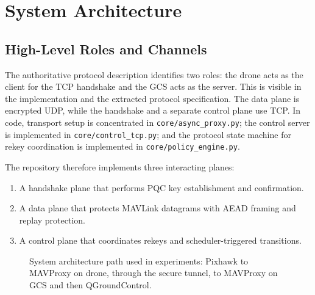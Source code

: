 \documentclass[conference]{IEEEtran}
\begin{document}
\section{System Architecture}
\subsection{High-Level Roles and Channels}
The authoritative protocol description identifies two roles: the drone acts as the client for the TCP handshake and the GCS acts as the server. This is visible in the implementation and the extracted protocol specification. The data plane is encrypted UDP, while the handshake and a separate control plane use TCP. In code, transport setup is concentrated in \texttt{core/async\_proxy.py}; the control server is implemented in \texttt{core/control\_tcp.py}; and the protocol state machine for rekey coordination is implemented in \texttt{core/policy\_engine.py}.

The repository therefore implements three interacting planes:
\begin{enumerate}[leftmargin=*]
\item A handshake plane that performs PQC key establishment and confirmation.
\item A data plane that protects MAVLink datagrams with AEAD framing and replay protection.
\item A control plane that coordinates rekeys and scheduler-triggered transitions.
\end{enumerate}

\begin{figure}[htbp]
\centering
{}
\caption{System architecture path used in experiments: Pixhawk to MAVProxy on drone, through the secure tunnel, to MAVProxy on GCS and then QGroundControl.}
\label{fig:system-architecture}
\end{figure}
\end{document}
